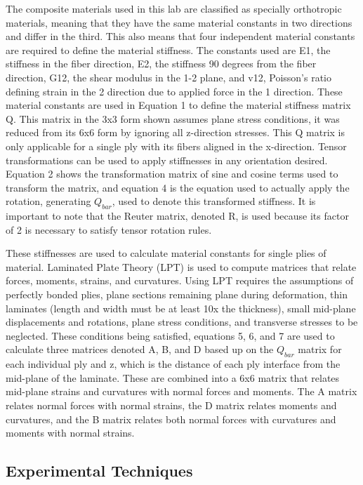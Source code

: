 \documentclass[12pt]{article}
\begin{document}
The composite materials used in this lab are classified as specially orthotropic materials, meaning that they have the same material constants in two directions and differ in the third. This also means that four independent material constants are required to define the material stiffness. The constants used are E1, the stiffness in the fiber direction, E2, the stiffness 90 degrees from the fiber direction, G12, the shear modulus in the 1-2 plane, and v12, Poisson's ratio defining strain in the 2 direction due to applied force in the 1 direction. These material constants are used in Equation 1 to define the material stiffness matrix Q. This matrix in the 3x3 form shown assumes plane stress conditions, it was reduced from its 6x6 form by ignoring all z-direction stresses. This Q matrix is only applicable for a single ply with its fibers aligned in the x-direction. Tensor transformations can be used to apply stiffnesses in any orientation desired. Equation 2 shows the transformation matrix of sine and cosine terms used to transform the matrix, and equation 4 is the equation used to actually apply the rotation, generating $Q_{bar}$, used to denote this transformed stiffness. It is important to note that the Reuter matrix, denoted R, is used because its factor of 2 is necessary to satisfy tensor rotation rules.

These stiffnesses are used to calculate material constants for single plies of material. Laminated Plate Theory (LPT) is used to compute matrices that relate forces, moments, strains, and curvatures. Using LPT requires the assumptions of perfectly bonded plies, plane sections remaining plane during deformation, thin laminates (length and width must be at least 10x the thickness), small mid-plane displacements and rotations, plane stress conditions, and transverse stresses to be neglected. These conditions being satisfied, equations 5, 6, and 7 are used to calculate three matrices denoted A, B, and D based up on the $Q_{bar}$ matrix for each individual ply and z, which is the distance of each ply interface from the mid-plane of the laminate. These are combined into a 6x6 matrix that relates mid-plane strains and curvatures with normal forces and moments. The A matrix relates normal forces with normal strains, the D matrix relates moments and curvatures, and the B matrix relates both normal forces with curvatures and moments with normal strains.


\subsection{Experimental Techniques} %
\end{document}
